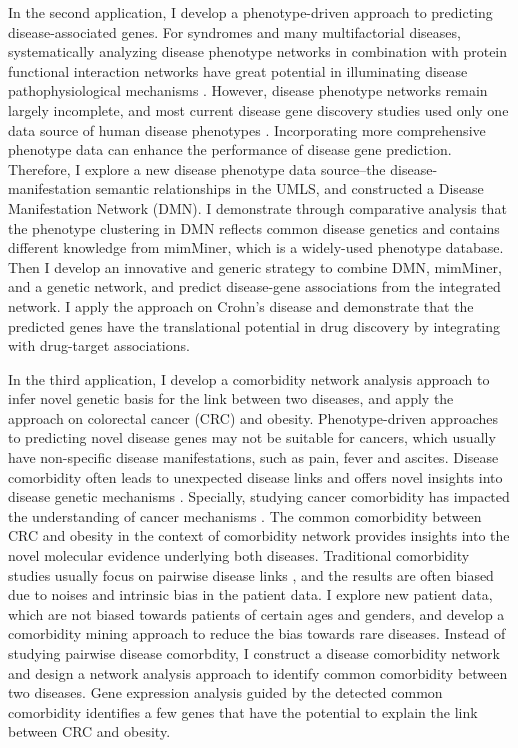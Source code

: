 In the second application, I develop a phenotype-driven approach to predicting disease-associated genes.
For syndromes and many multifactorial diseases,
systematically analyzing disease phenotype networks in combination
with protein functional interaction networks have great potential in illuminating
disease pathophysiological mechanisms
\cite{barabasi2011network,oti2008phenome,houle2010phenomics}.
However, disease phenotype networks remain largely incomplete, and
most current disease gene discovery studies used only one data source of human disease phenotypes
\cite{lage2007human,li2010genome,wu2008network,wu2009align,vanunu2010associating}.
Incorporating more comprehensive phenotype data can enhance the performance
of disease gene prediction.
Therefore, I explore a new disease phenotype data source--the disease-manifestation
semantic relationships in the UMLS, and constructed a
Disease Manifestation Network (DMN).
I demonstrate through comparative analysis that the phenotype clustering
in DMN reflects common disease genetics and contains different knowledge from mimMiner, which is a
widely-used phenotype database.
Then I develop an innovative and generic strategy to combine DMN, mimMiner,
and a genetic network, and predict disease-gene associations from the integrated network.
I apply the approach on Crohn's disease and demonstrate that the predicted genes have the translational
potential in drug discovery by integrating with drug-target associations.

In the third application, I develop a comorbidity network analysis approach
to infer novel genetic basis for the link between two diseases,
and apply the approach on colorectal cancer (CRC) and obesity.
Phenotype-driven approaches to predicting novel disease genes
may not be suitable for cancers, which usually have non-specific
disease manifestations, such as pain, fever and ascites.
Disease comorbidity often leads to unexpected disease links \cite{oti2008phenome}
and offers novel insights into disease genetic mechanisms \cite{blair2013nondegenerate,avery2011phenomics}.
Specially, studying cancer comorbidity has impacted the understanding of cancer mechanisms \cite{chen2014mining}.
The common comorbidity between CRC and obesity in the context of comorbidity network
provides insights into the novel molecular evidence underlying both diseases.
Traditional comorbidity studies usually focus on pairwise disease links
\cite{rzhetsky2007probing,park2009impact,hidalgo2009dynamic,roque2011using}, and
the results are often biased due to noises and intrinsic bias in the patient data.
I explore new patient data, which are not biased towards patients of certain ages and genders, and
develop a comorbidity mining approach to reduce the bias towards rare diseases.
Instead of studying pairwise disease comorbdity,
I construct a disease comorbidity network and design a network analysis approach to identify common comorbidity between two diseases.
Gene expression analysis guided by the detected common comorbidity identifies a few genes that have the potential to explain the link between CRC and obesity.

